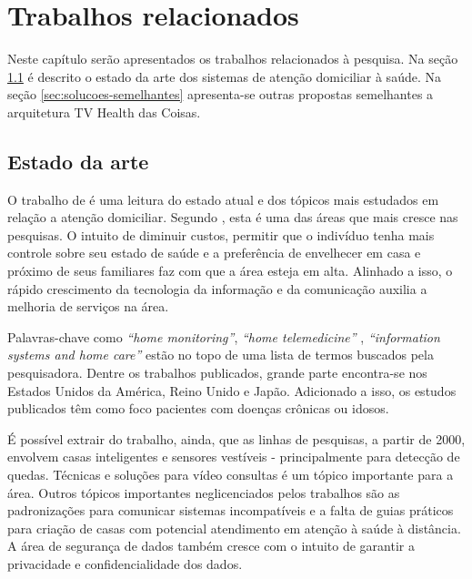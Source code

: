 \chapter{Trabalhos relacionados}\label{cap:trabalhos-relacionados}

Neste capítulo serão apresentados os trabalhos relacionados à pesquisa. Na
seção \ref{sec:estado-da-arte} é descrito o estado da arte dos sistemas 
de atenção domiciliar à saúde. Na seção \ref{sec:solucoes-semelhantes}
apresenta-se outras propostas semelhantes a arquitetura TV Health das Coisas.


\section{Estado da arte} \label{sec:estado-da-arte}

O trabalho de  é uma leitura do estado atual e dos
tópicos mais estudados em relação a atenção domiciliar. Segundo \citeauthor{koch2006home},
esta é uma das áreas que mais cresce nas pesquisas. O intuito de diminuir custos,
permitir que o indivíduo tenha mais controle sobre seu estado de saúde e a
preferência de envelhecer em casa e próximo de seus familiares faz com que a
área esteja em alta. Alinhado a isso, o rápido crescimento da tecnologia da
informação e da comunicação auxilia a melhoria de serviços na área.

Palavras-chave como \textit{``home monitoring''}, \textit{``home
telemedicine''} , \textit{``information systems and home care''} estão no topo
de uma lista de termos buscados pela pesquisadora. Dentre os trabalhos
publicados, grande parte encontra-se nos Estados Unidos da América, Reino Unido
e Japão. Adicionado a isso, os estudos publicados têm como foco pacientes com
doenças crônicas ou idosos.

É possível extrair do trabalho, ainda, que as linhas de pesquisas, a partir de
2000, envolvem casas inteligentes e sensores vestíveis - principalmente para
detecção de quedas. Técnicas e soluções para vídeo consultas é um tópico
importante para a área. Outros tópicos importantes neglicenciados pelos
trabalhos são as padronizações para comunicar sistemas incompatíveis e a falta
de guias práticos para criação de casas com potencial atendimento em atenção à
saúde à distância. A área de segurança de dados também cresce com o intuito de
garantir a privacidade e confidencialidade dos dados.

